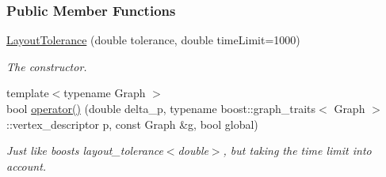\subsubsection*{Public Member Functions}
\begin{DoxyCompactItemize}
\item 
\hyperlink{structslb_1_1core_1_1ui_1_1LayoutTolerance_ae16668637c1a3bd4662179a57e03d841}{Layout\+Tolerance} (double tolerance, double time\+Limit=1000)
\begin{DoxyCompactList}\small\item\em The constructor. \end{DoxyCompactList}\item 
{\footnotesize template$<$typename Graph $>$ }\\bool \hyperlink{structslb_1_1core_1_1ui_1_1LayoutTolerance_aeeeee3994dae517b3a0be5a9b4934827}{operator()} (double delta\+\_\+p, typename boost\+::graph\+\_\+traits$<$ Graph $>$\+::vertex\+\_\+descriptor p, const Graph \&g, bool global)\hypertarget{structslb_1_1core_1_1ui_1_1LayoutTolerance_aeeeee3994dae517b3a0be5a9b4934827}{}\label{structslb_1_1core_1_1ui_1_1LayoutTolerance_aeeeee3994dae517b3a0be5a9b4934827}

\begin{DoxyCompactList}\small\item\em Just like boost\textquotesingle{}s {\ttfamily layout\+\_\+tolerance$<$double$>$}, but taking the time limit into account. \end{DoxyCompactList}\end{DoxyCompactItemize}
